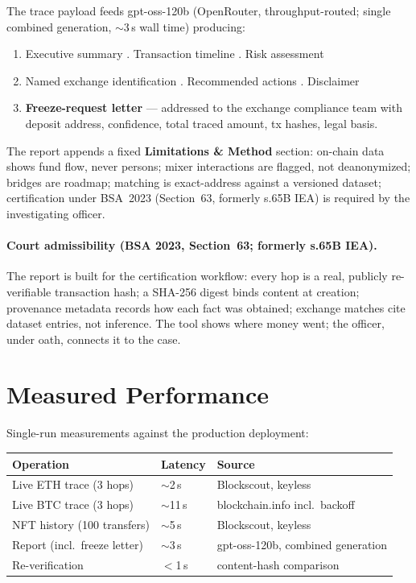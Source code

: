 \documentclass[11pt,a4paper]{article}
\begin{document}
The trace payload feeds gpt-oss-120b (OpenRouter, throughput-routed; single
combined generation, $\sim$3\,s wall time) producing:
\begin{enumerate}[itemsep=0.06em]
  \item Executive summary . Transaction timeline . Risk assessment
  \item Named exchange identification . Recommended actions . Disclaimer
  \item \textbf{Freeze-request letter} --- addressed to the exchange compliance
  team with deposit address, confidence, total traced amount, tx hashes, legal basis.
\end{enumerate}
The report appends a fixed \textbf{Limitations \& Method} section:
on-chain data shows fund flow, never persons; mixer interactions are flagged, not
deanonymized; bridges are roadmap; matching is exact-address against a versioned
dataset; certification under BSA~2023 (Section~63, formerly s.65B IEA) is required by the investigating officer.

\paragraph{Court admissibility (BSA 2023, Section~63; formerly s.65B IEA).}
The report is built for the certification workflow: every hop is a real,
publicly re-verifiable transaction hash; a SHA-256 digest binds content at
creation; provenance metadata records how each fact was obtained; exchange
matches cite dataset entries, not inference. The tool shows where money went;
the officer, under oath, connects it to the case.

\section{Measured Performance}

Single-run measurements against the production deployment:

\begin{tabular}{@{}lll@{}}
\toprule
\textbf{Operation} & \textbf{Latency} & \textbf{Source} \\
\midrule
Live ETH trace (3 hops) & $\sim$2\,s & Blockscout, keyless \\
Live BTC trace (3 hops) & $\sim$11\,s & blockchain.info incl.\ backoff \\
NFT history (100 transfers) & $\sim$5\,s & Blockscout, keyless \\
Report (incl.\ freeze letter) & $\sim$3\,s & gpt-oss-120b, combined generation \\
Re-verification & $<$1\,s & content-hash comparison \\
\bottomrule
\end{tabular}
\end{document}
